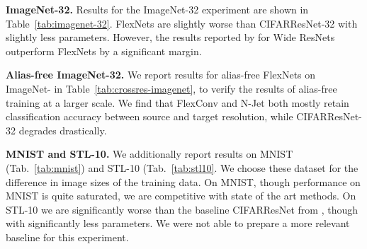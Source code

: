 \documentclass{article} \usepackage{iclr2022_conference,times}
\begin{document}
\textbf{ImageNet-32.} Results for the ImageNet-32 experiment are shown in Table~\ref{tab:imagenet-32}. FlexNets are slightly worse than CIFARResNet-32 \citep{he2016deep} with slightly less parameters. However, the results reported by \citet{ChrabaszczLH17} for Wide ResNets \citep{zagoruyko2016wide} outperform FlexNets by a significant margin.

\textbf{Alias-free ImageNet-32.} We report results for alias-free FlexNets on ImageNet- \citep{ChrabaszczLH17} in Table~\ref{tab:crossres-imagenet}, to verify the results of alias-free training at a larger scale. We find that FlexConv and N-Jet both mostly retain classification accuracy between source and target resolution, while CIFARResNet-32 degrades drastically.

\textbf{MNIST and STL-10.} We additionally report results on MNIST (Tab.~\ref{tab:mnist}) and STL-10 (Tab.~\ref{tab:stl10}. We choose these dataset for the difference in image sizes of the training data. On MNIST, though performance on MNIST is quite saturated, we are competitive with state of the art methods. On STL-10 we are significantly worse than the baseline CIFARResNet from \citep{luo2020extended}, though with significantly less parameters. We were not able to prepare a more relevant baseline for this experiment.

\begin{table}
\centering
\caption{Results on MNIST. We train each model with three different seeds and report mean and standard deviation. *Results are taken from the respective original works instead of reproduced. \dagger Results are from single run.}
\label{tab:mnist}
\begin{center}
\end{center}
\end{table}
\end{document}

